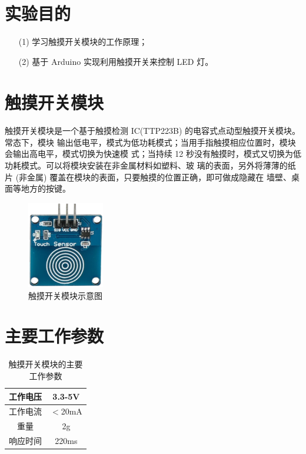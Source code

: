 \documentclass[UTF8, oneside]{ctexbook}
\begin{document}
\section{实验目的}
\begin{itemize}
    \item[(1)] 学习触摸开关模块的工作原理；
    \item[(2)] 基于 Arduino 实现利用触摸开关来控制 LED 灯。
\end{itemize}

\section{触摸开关模块}
\paragraph{}
触摸开关模块是一个基于触摸检测 IC(TTP223B) 的电容式点动型触摸开关模块。常态下，模块
输出低电平，模式为低功耗模式；当用手指触摸相应位置时，模块会输出高电平，模式切换为快速模
式；当持续 12 秒没有触摸时，模式又切换为低功耗模式。可以将模块安装在非金属材料如塑料、玻
璃的表面，另外将薄薄的纸片 (非金属) 覆盖在模块的表面，只要触摸的位置正确，即可做成隐藏在
墙壁、桌面等地方的按键。
\begin{figure}[h]
    \centering
    \includegraphics[width=0.3\textwidth]{./result/sensor/7/sensor.png}
    \caption{触摸开关模块示意图}
    \label{7_sensor}
\end{figure}

\section{主要工作参数}
\newpage
\begin{table}[h]
    \centering
    \begin{tabular}{|c|c|}
    \hline
    工作电压   & 3.3-5V         \\ \hline
    工作电流 & $<$20mA \\ \hline
    重量 & 2g \\ \hline
    响应时间   & 220ms  \\ \hline
    \end{tabular}
    \caption{触摸开关模块的主要工作参数}
\end{table}
\end{document}
